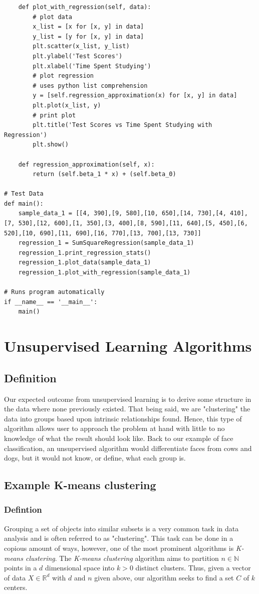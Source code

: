 \documentclass[12pt]{article}
\begin{document}
\begin{lstlisting}
	def plot_with_regression(self, data):
		# plot data
		x_list = [x for [x, y] in data]
		y_list = [y for [x, y] in data]
		plt.scatter(x_list, y_list)
		plt.ylabel('Test Scores')
		plt.xlabel('Time Spent Studying')
		# plot regression
		# uses python list comprehension
		y = [self.regression_approximation(x) for [x, y] in data]
		plt.plot(x_list, y)
		# print plot
		plt.title('Test Scores vs Time Spent Studying with Regression')
		plt.show()		

	def regression_approximation(self, x):
		return (self.beta_1 * x) + (self.beta_0)

# Test Data
def main():
	sample_data_1 = [[4, 390],[9, 580],[10, 650],[14, 730],[4, 410],[7, 530],[12, 600],[1, 350],[3, 400],[8, 590],[11, 640],[5, 450],[6, 520],[10, 690],[11, 690],[16, 770],[13, 700],[13, 730]]
	regression_1 = SumSquareRegression(sample_data_1)
	regression_1.print_regression_stats()
	regression_1.plot_data(sample_data_1)
	regression_1.plot_with_regression(sample_data_1)

# Runs program automatically
if __name__ == '__main__':
	main()
\end{lstlisting}
\section{Unsupervised Learning Algorithms}
\subsection{Definition}
Our expected outcome from unsupervised learning is to derive some structure in the data where none previously existed. That being said, we are "clustering" the data into groups based upon intrinsic relationships found. Hence, this type of algorithm allows user to approach the problem at hand with little to no knowledge of what the result should look like. Back to our example of face classification, an unsupervised algorithm would differentiate faces from cows and dogs, but it would not know, or define, what each group is.  
\subsection{Example K-means clustering}
\subsubsection{Defintion}
Grouping a set of objects into similar subsets is a very common task in data analysis and is often referred to as "clustering". This task can be done in a copious amount of ways, however, one of the most prominent algorithms is \textit{K-means clustering}. The  \textit{K-means clustering} algorithm aims to partition $n \in \mathbb{N}$ points in a $d$ dimensional space into $k > 0$ distinct clusters. Thus, given a vector of data $X \in \mathbb{R}^d$ with $d$ and $n$ given above, our algorithm seeks to find a set $C$ of $k$ centers. \cite{MacKay} 
\end{document}
